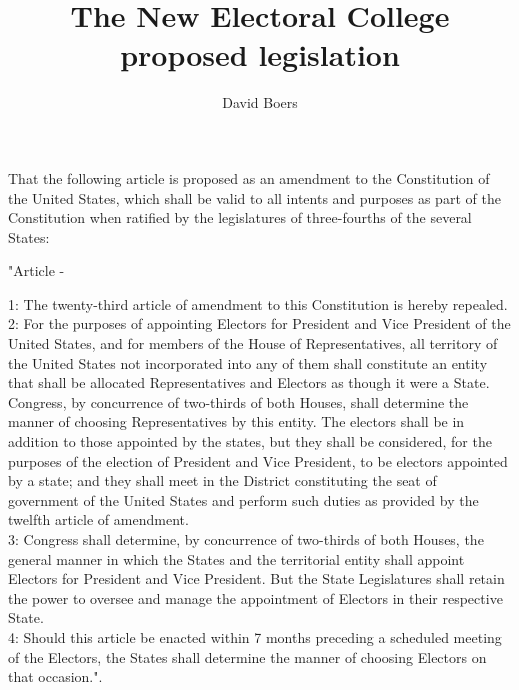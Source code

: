 \documentclass{article}
\title{The New Electoral College proposed legislation}
\author{David Boers}
\begin{document}
    \subject{To propose an Amendment to the Constitution of the United States to modify the Electoral College and for other purposes.}
    That the following article is proposed as an amendment to the Constitution of the United States, which shall be valid to all intents and purposes as part of the Constitution when ratified by the legislatures of three-fourths of the several States:\\
    \begin{center}"Article -\end{center}
    1: The twenty-third article of amendment to this Constitution is hereby repealed.\\
    2: For the purposes of appointing Electors for President and Vice President of the United States, and for members of the House of Representatives, 
        all territory of the United States not incorporated into any of them shall constitute an entity that shall be allocated Representatives and 
        Electors as though it were a State. Congress, by concurrence of two-thirds of both Houses, shall determine the manner of choosing Representatives 
        by this entity. The electors shall be in addition to those appointed by the states, but they shall be considered, for the purposes of the election 
        of President and Vice President, to be electors appointed by a state; and they shall meet in the District constituting the seat of government of 
        the United States and perform such duties as provided by the twelfth article of amendment.\\
    3: Congress shall determine, by concurrence of two-thirds of both Houses, the general manner in which the States and the territorial entity shall 
        appoint Electors for President and Vice President. But the State Legislatures shall retain the power to oversee and manage the appointment of 
        Electors in their respective State.\\
    4: Should this article be enacted within 7 months preceding a scheduled meeting of the Electors, the States shall determine the manner of choosing 
        Electors on that occasion.".\\
\end{document}
